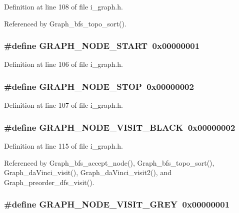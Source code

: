 Definition at line 108 of file i\_\-graph.h.

Referenced by Graph\_\-bfs\_\-topo\_\-sort().
\subsubsection{\setlength{\rightskip}{0pt plus 5cm}\#define GRAPH\_\-NODE\_\-START~0x00000001}\label{i__graph_8h_1dda49ee97f471f8f30de4801bbfa37f}




Definition at line 106 of file i\_\-graph.h.
\subsubsection{\setlength{\rightskip}{0pt plus 5cm}\#define GRAPH\_\-NODE\_\-STOP~0x00000002}\label{i__graph_8h_386515ef9385708a9a8c30e2c94e95dc}




Definition at line 107 of file i\_\-graph.h.
\subsubsection{\setlength{\rightskip}{0pt plus 5cm}\#define GRAPH\_\-NODE\_\-VISIT\_\-BLACK~0x00000002}\label{i__graph_8h_1a3cbdc80e03fd20e077095f803b3c7e}




Definition at line 115 of file i\_\-graph.h.

Referenced by Graph\_\-bfs\_\-accept\_\-node(), Graph\_\-bfs\_\-topo\_\-sort(), Graph\_\-da\-Vinci\_\-visit(), Graph\_\-da\-Vinci\_\-visit2(), and Graph\_\-preorder\_\-dfs\_\-visit().
\subsubsection{\setlength{\rightskip}{0pt plus 5cm}\#define GRAPH\_\-NODE\_\-VISIT\_\-GREY~0x00000001}\label{i__graph_8h_a8db2a94115da3c7f6c9b7a1d151cdcb}




